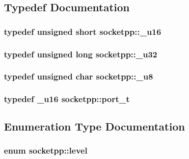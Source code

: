 \subsection{Typedef Documentation}
\hypertarget{namespacesocketpp_0d48e817f00cbb84d07faec41ee4b169}{
\subsubsection[{\_\-u16}]{\setlength{\rightskip}{0pt plus 5cm}typedef unsigned short {\bf socketpp::\_\-u16}}}
\label{namespacesocketpp_0d48e817f00cbb84d07faec41ee4b169}


\hypertarget{namespacesocketpp_d9c3b2ad093bb5814af59760e0a2192a}{
\subsubsection[{\_\-u32}]{\setlength{\rightskip}{0pt plus 5cm}typedef unsigned long {\bf socketpp::\_\-u32}}}
\label{namespacesocketpp_d9c3b2ad093bb5814af59760e0a2192a}


\hypertarget{namespacesocketpp_1398da7d8125cdb32e89041e5b0adb96}{
\subsubsection[{\_\-u8}]{\setlength{\rightskip}{0pt plus 5cm}typedef unsigned char {\bf socketpp::\_\-u8}}}
\label{namespacesocketpp_1398da7d8125cdb32e89041e5b0adb96}


\hypertarget{namespacesocketpp_5517ef80f249b891a2ba64b95fc1e723}{
\subsubsection[{port\_\-t}]{\setlength{\rightskip}{0pt plus 5cm}typedef {\bf \_\-u16} {\bf socketpp::port\_\-t}}}
\label{namespacesocketpp_5517ef80f249b891a2ba64b95fc1e723}




\subsection{Enumeration Type Documentation}
\hypertarget{namespacesocketpp_4dbb83d08769b55fc6e283b73ae11bb5}{
\subsubsection[{level}]{\setlength{\rightskip}{0pt plus 5cm}enum {\bf socketpp::level}}}
\label{namespacesocketpp_4dbb83d08769b55fc6e283b73ae11bb5}


